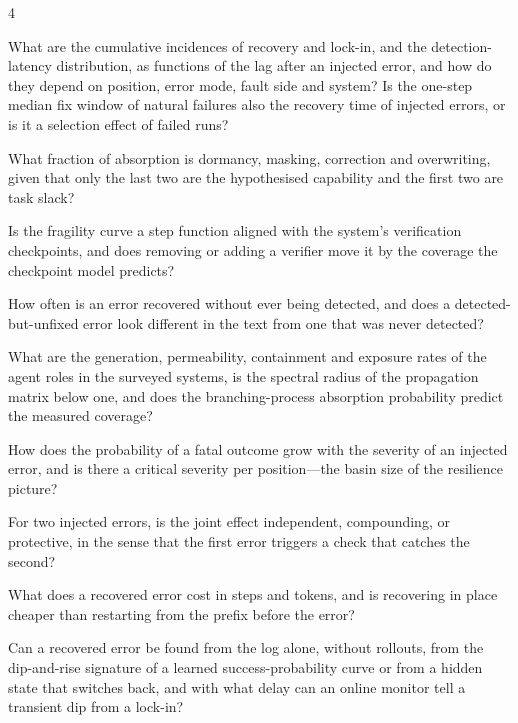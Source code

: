 \begin{rqbox}{4}
\begin{description}[leftmargin=3.2em,style=sameline,font=\bfseries,itemsep=1.5pt]
\item[RQ\,4.1] What are the cumulative incidences of recovery and lock-in, and the detection-latency distribution, as functions of the lag after an injected error, and how do they depend on position, error mode, fault side and system? Is the one-step median fix window of natural failures also the recovery time of injected errors, or is it a selection effect of failed runs?
\item[RQ\,4.2] What fraction of absorption is dormancy, masking, correction and overwriting, given that only the last two are the hypothesised capability and the first two are task slack?
\item[RQ\,4.3] Is the fragility curve a step function aligned with the system's verification checkpoints, and does removing or adding a verifier move it by the coverage the checkpoint model predicts?
\item[RQ\,4.4] How often is an error recovered without ever being detected, and does a detected-but-unfixed error look different in the text from one that was never detected?
\item[RQ\,4.5] What are the generation, permeability, containment and exposure rates of the agent roles in the surveyed systems, is the spectral radius of the propagation matrix below one, and does the branching-process absorption probability predict the measured coverage?
\item[RQ\,4.6] How does the probability of a fatal outcome grow with the severity of an injected error, and is there a critical severity per position---the basin size of the resilience picture?
\item[RQ\,4.7] For two injected errors, is the joint effect independent, compounding, or protective, in the sense that the first error triggers a check that catches the second?
\item[RQ\,4.8] What does a recovered error cost in steps and tokens, and is recovering in place cheaper than restarting from the prefix before the error?
\item[RQ\,4.9] Can a recovered error be found from the log alone, without rollouts, from the dip-and-rise signature of a learned success-probability curve or from a hidden state that switches back, and with what delay can an online monitor tell a transient dip from a lock-in?
\end{description}
\end{rqbox}

